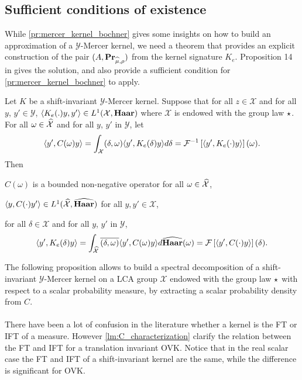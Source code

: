 \subsection{Sufficient conditions of existence}
\label{subsec:sufficient_conditions}
While \cref{pr:mercer_kernel_bochner} gives some insights on how to build an approximation of a $\mathcal{Y}$-Mercer kernel, we need a theorem that provides an explicit construction of the pair $(A, {\mathbf{{Pr}}}_{\widehat{\mu},\rho})$ from the kernel signature $K_e$. Proposition 14 in \citet{Carmeli2010} gives the solution, and also provide a sufficient condition for \cref{pr:mercer_kernel_bochner} to apply.
\begin{proposition}
\label{pr:inverse_ovk_Fourier_decomposition}
Let $K$ be a shift-invariant $\mathcal{Y}$-Mercer kernel. %
Suppose that for all $z \in \mathcal{X}$ and for all $y$, $y' \in\mathcal{Y}$, $\langle K_e(.)y,y'\rangle\in L^1(\mathcal{X},\mathbf{Haar})$ where $\mathcal{X}$ is endowed with the group law $\star$. For all $\omega \in \widehat{\mathcal{X}}$ and for all $y$, $y'$ in $\mathcal{Y}$, let
\begin{dmath}\label{eq:CK0}
\inner{y',C(\omega)y} = \int_{\mathcal{X}} \pairing{\delta, \omega}\inner{y', K_e(\delta)y}d\delta = \IFT{\inner{y', K_e(\cdot)y}}(\omega).
\end{dmath}
Then
\begin{propenum}
\item $C(\omega)$ is a bounded non-negative operator for all $\omega \in \widehat{\mathcal{X}}$,
\item $\langle y, C(\cdot)y'\rangle\in L^1(\widehat{\mathcal{X}},\widehat{\mathbf{Haar}})$ for all $y,y'\in\mathcal{X}$,
\item for all $\delta\in\mathcal{X}$ and for all $y$, $y'$ in $\mathcal{Y}$,
\begin{dmath*}
\inner{y', K_e(\delta)y}= \int_{\dual{\mathcal{X}}}\conj{\pairing{\delta,\omega}}\inner{y', C(\omega)y}d\dual{\Haar}(\omega)
=\FT{\inner{y', C(\cdot)y}}(\delta).
\end{dmath*}
\end{propenum}
\end{proposition}
The following proposition allows to build a spectral decomposition of a shift-invariant $\mathcal{Y}$-Mercer kernel on a \acs{LCA} group $\mathcal{X}$ endowed with the group law $\star$ with respect to a scalar probability measure, by extracting a scalar probability density from $C$.
\paragraph{}
There have been a lot of confusion in the literature whether a kernel is the \acl{FT} or \acl{IFT} of a measure. However \cref{lm:C_characterization} clarify the relation between the \acl{FT} and \acl{IFT} for a translation invariant \acl{OVK}. Notice that in the real scalar case the \acl{FT} and \acl{IFT} of a shift-invariant kernel are the same, while the difference is significant for \acs{OVK}.
